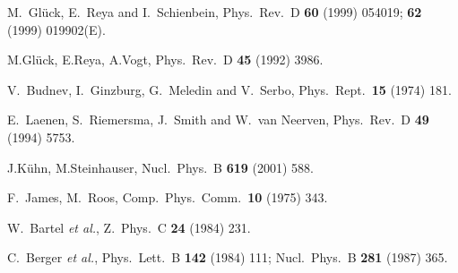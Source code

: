 \documentclass[aps,prl,twocolumn,groupedaddress]{revtex4}
\begin{document}
\begin{thebibliography}{1}
M.~Gl\"uck, E.~Reya and I.~Schienbein,
Phys.\ Rev.\ D {\bf 60} (1999) 054019; {\bf 62} (1999) 019902(E).


M.Gl\"uck, E.Reya, A.Vogt,
Phys.\ Rev.\ D {\bf 45} (1992) 3986.


V.~Budnev, I.~Ginzburg, G.~Meledin and V.~Serbo,
Phys.\ Rept.\  {\bf 15} (1974) 181.


E.~Laenen, S.~Riemersma, J.~Smith and W.~van Neerven,
Phys.\ Rev.\ D {\bf 49} (1994) 5753.


J.K\"uhn, M.Steinhauser,
Nucl.\ Phys.\ B {\bf 619} (2001) 588.


F.~James, M.~Roos,
Comp.\ Phys.\ Comm.\  {\bf 10} (1975) 343.


W.~Bartel {\it et al.}, %
Z.\ Phys.\ C {\bf 24} (1984) 231.

C.~Berger {\it et al.}, %
Phys.\ Lett.\ B {\bf 142} (1984) 111;
Nucl.\ Phys.\ B {\bf 281} (1987) 365.


\end{thebibliography}
\end{document}
